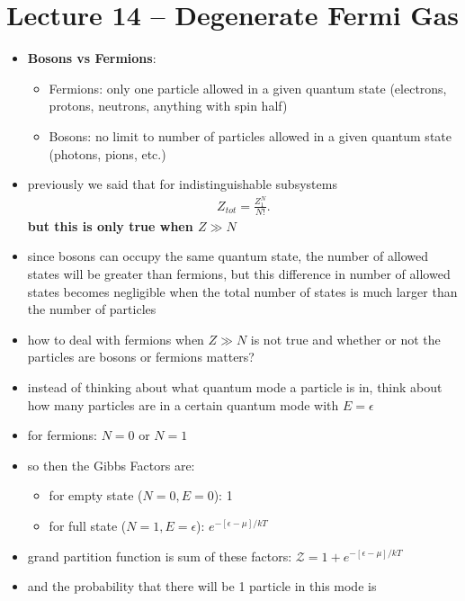 \documentclass[10pt]{article}
\begin{document}
\section{Lecture 14 -- Degenerate Fermi Gas}
\begin{itemize}
    \item \textbf{Bosons vs Fermions}:
        \begin{itemize}
            \item Fermions: only one particle allowed in a given quantum state (electrons, protons, neutrons, anything with spin half)
            \item Bosons: no limit to number of particles allowed in a given quantum state (photons, pions, etc.)
        \end{itemize}
    \item previously we said that for indistinguishable subsystems 
        \begin{gather*}
            Z_{tot} = \frac{Z_1^N}{N!}
        .\end{gather*}
        \textbf{but this is only true when $Z\gg N$} 
    \item since bosons can occupy the same quantum state, the number of allowed states will be greater than fermions, but this difference in number of allowed states becomes negligible when the total number of states is much larger than the number of particles
    \item how to deal with fermions when $Z \gg N$ is not true and whether or not the particles are bosons or fermions matters?
    \item instead of thinking about what quantum mode a particle is in, think about how many particles are in a certain quantum mode with $E = \epsilon$
    \item for fermions: $N = 0$ or $N = 1$ 
    \item so then the Gibbs Factors are:
        \begin{itemize}
            \item for empty state ($N=0, E=0$): 1 
            \item for full state ($N=1, E=\epsilon$): $e^{-[\epsilon-\mu] / kT}$
        \end{itemize}
    \item grand partition function is sum of these factors: $\mathcal{Z} = 1 + e^{-[\epsilon-\mu] / kT}$
    \item and the probability that there will be 1 particle in this mode is 
        \begin{gather*}

\end{gather*}
\end{itemize}
\end{document}
